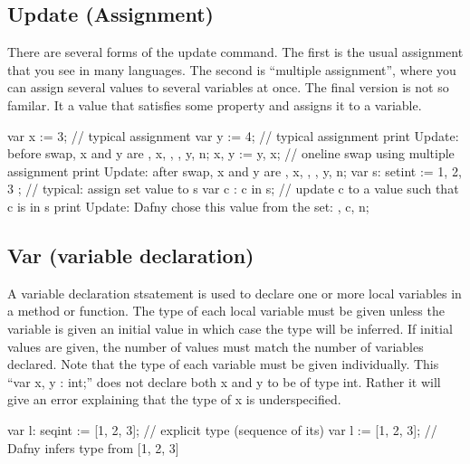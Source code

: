 \documentclass[letterpaper,10pt,english]{sphinxmanual}
\begin{document}
\subsection{Update (Assignment)}
\label{\detokenize{06-dafny-language:update-assignment}}
There are several forms of the update command. The first is the usual
assignment that you see in many languages. The second is “multiple
assignment”, where you can assign several values to several variables
at once. The final version is not so familar. It  a value
that satisfies some property and assigns it to a variable.

\begin{sphinxVerbatim}[commandchars=\\\{\}]
var x := 3;         // typical assignment
var y := 4;         // typical assignment
print \PYGZdq{}Update: before swap, x and y are \PYGZdq{}, x, \PYGZdq{}, \PYGZdq{}, y, \PYGZdq{}\PYGZbs{}n\PYGZdq{};
x, y := y, x;       // one\PYGZhy{}line swap using multiple assignment
print \PYGZdq{}Update: after swap, x and y are \PYGZdq{}, x, \PYGZdq{}, \PYGZdq{}, y, \PYGZdq{}\PYGZbs{}n\PYGZdq{};
var s: set\PYGZlt{}int\PYGZgt{} := \PYGZob{} 1, 2, 3 \PYGZcb{}; // typical: assign set value to s
var c :\textbar{} c in s;    // update c to a value such that c is in s
print \PYGZdq{}Update: Dafny chose this value from the set: \PYGZdq{}, c, \PYGZdq{}\PYGZbs{}n\PYGZdq{};
\end{sphinxVerbatim}


\subsection{Var (variable declaration)}
\label{\detokenize{06-dafny-language:var-variable-declaration}}
A variable declaration stsatement is used to declare one or more local
variables in a method or function. The type of each local variable
must be given unless the variable is given an initial value in which
case the type will be inferred. If initial values are given, the
number of values must match the number of variables declared. Note
that the type of each variable must be given individually. This “var
x, y : int;” does not declare both x and y to be of type int. Rather
it will give an error explaining that the type of x is underspecified.

\begin{sphinxVerbatim}[commandchars=\\\{\}]
var l: seq\PYGZlt{}int\PYGZgt{} := [1, 2, 3]; // explicit type (sequence of its)
var l\PYGZsq{}          := [1, 2, 3]; // Dafny infers type from [1, 2, 3]
\end{sphinxVerbatim}
\end{document}
